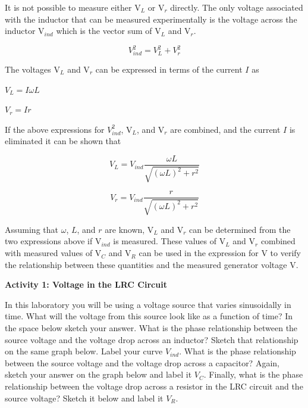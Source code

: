 It is not possible to measure either V\( _{L} \) or V\( _{r} \)
directly. The only voltage associated with the inductor that can be
measured experimentally is the voltage across the inductor V\( _{ind} \)
which is the vector sum of V\( _{L} \) and V\( _{r} \).

\[
V_{ind}^{2}=V_{L}^{2}+V_{r}^{2}\]


The voltages V\( _{L} \) and V\( _{r} \) can be expressed in terms
of the current $I$ as

{\centering \( V_{L}=I\omega L \) \par}

{\centering \( V_{r}=Ir \)\par}

If the above expressions for \( V_{ind}^{2} \), V\( _{L} \), and
V\( _{r} \) are combined, and the current $I$ is eliminated it can
be shown that

\[
V_{L}=V_{ind}\frac{\omega L}{\sqrt{(\omega L)^{2}+r^{2}}}\]


\[
V_{r}=V_{ind}\frac{r}{\sqrt{(\omega L)^{2}+r^{2}}}\]


Assuming that \( \omega  \), $L$, and $r$ are known, V\( _{L} \) and
V\( _{r} \) can be determined from the two expressions above if V\( _{ind} \)
is measured. These values of V\( _{L} \) and V\( _{r} \) combined
with measured values of V\( _{C} \) and V\( _{R} \) can be used
in the expression for V to verify the relationship between these quantities
and the measured generator voltage V.

\textbf{Activity 1: Voltage in the LRC Circuit }

In this laboratory you will be using a voltage source that varies
sinusoidally in time.
What will the voltage from this source look like as a function
of time?
In the space below sketch your answer.
What is the phase relationship between the source voltage and the
voltage drop across an inductor?
Sketch that relationship on the same graph below.
Label your curve $V_{ind}$.
What is the phase relationship between the source voltage and the voltage
drop across a capacitor?
Again, sketch your answer on the graph below and label it $V_C$.
Finally, what is the phase relationship between the voltage drop
across a resistor in the LRC circuit and the source voltage?
Sketch it below and label it $V_R$.

\vspace{0.3cm}
{\centering {} \par}
\vspace{0.3cm}

